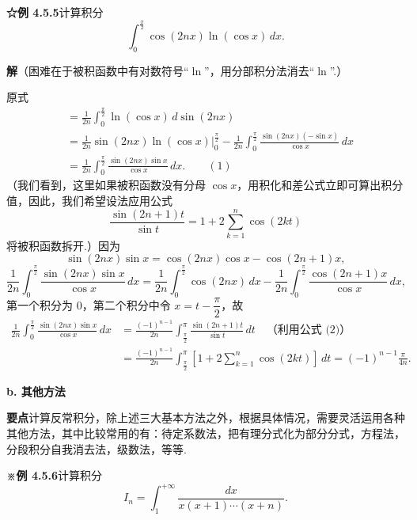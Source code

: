 \documentclass[UTF8, 12pt, fontset=fandol, oneside]{ctexart}
\begin{document}
\noindent\textbf{☆例 4.5.5}\quad 计算积分
\[
\int_0^{\frac\pi2}\cos(2nx)\ln(\cos x)\,dx.
\]

\noindent\textbf{解}\quad （困难在于被积函数中有对数符号“$\ln$”，用分部积分法消去“$\ln$”.）

原式
\[
\begin{aligned}
&=\frac1{2n}\int_0^{\frac\pi2}\ln(\cos x)\,d\sin(2nx)\\
&=\frac1{2n}\sin(2nx)\ln(\cos x)\Big|_0^{\frac\pi2}
-\frac1{2n}\int_0^{\frac\pi2}\frac{\sin(2nx)(-\sin x)}{\cos x}\,dx\\
&=\frac1{2n}\int_0^{\frac\pi2}
\frac{\sin(2nx)\sin x}{\cos x}\,dx. \qquad(1)
\end{aligned}
\]
（我们看到，这里如果被积函数没有分母 $\cos x$，用积化和差公式立即可算出积分值，因此，我们希望设法应用公式
\[
\frac{\sin(2n+1)t}{\sin t}=1+2\sum_{k=1}^n\cos(2kt) \tag{2}
\]
将被积函数拆开.）因为
\[
\sin(2nx)\sin x=\cos(2nx)\cos x-\cos(2n+1)x,
\]
\[
\frac1{2n}\int_0^{\frac\pi2}\frac{\sin(2nx)\sin x}{\cos x}\,dx
=\frac1{2n}\int_0^{\frac\pi2}\cos(2nx)\,dx
-\frac1{2n}\int_0^{\frac\pi2}\frac{\cos(2n+1)x}{\cos x}\,dx,
\]
第一个积分为 0，第二个积分中令 $x=t-\dfrac\pi2$，故
\[
\begin{aligned}
\frac1{2n}\int_0^{\frac\pi2}\frac{\sin(2nx)\sin x}{\cos x}\,dx
&=\frac{(-1)^{n-1}}{2n}
\int_{\frac\pi2}^{\pi}\frac{\sin(2n+1)t}{\sin t}\,dt\quad\text{（利用公式 (2)）}\\
&=\frac{(-1)^{n-1}}{2n}
\int_{\frac\pi2}^{\pi}\left[1+2\sum_{k=1}^n\cos(2kt)\right]\,dt
=(-1)^{n-1}\frac{\pi}{4n}.
\end{aligned}
\]

\noindent\textbf{b. 其他方法}

\noindent\textbf{要点}\quad 计算反常积分，除上述三大基本方法之外，根据具体情况，需要灵活运用各种其他方法，其中比较常用的有：待定系数法，把有理分式化为部分分式，方程法，分段积分自我消去法，级数法，等等.

\noindent\textbf{※例 4.5.6}\quad 计算积分
\[
I_n=\int_1^{+\infty}\frac{dx}{x(x+1)\cdots(x+n)}.
\]
\end{document}
